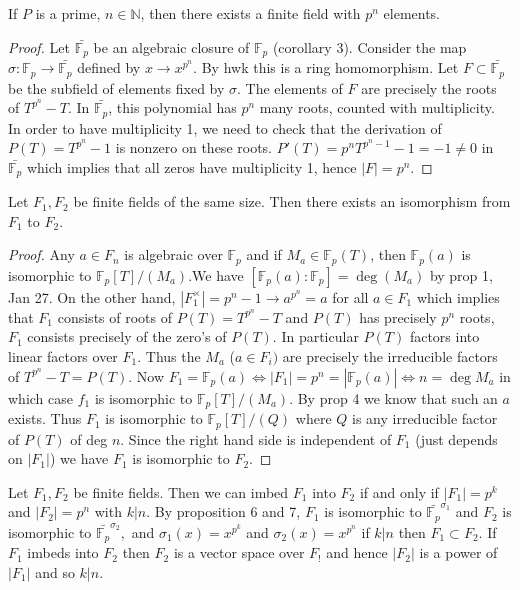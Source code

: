 \begin{prop}
If $P$ is a prime, $n\in\mathbb{N}$, then there exists a finite field with $p^n$ elements.
\end{prop}
\begin{proof} Let $\bar{\mathbb{F}_p}$ be an algebraic closure of $\mathbb{F}_p$ (corollary 3). Consider the map $\sigma:\mathbb{F}_p\longrightarrow\bar{\mathbb{F}_p}$ defined by $x\longrightarrow x^{p^n}$. By hwk this is a ring homomorphism. Let $F\subset\bar{\mathbb{F}_p}$ be the subfield of elements fixed by $\sigma$. The elements of $F$ are precisely the roots of $T^{p^n}-T$. In $\bar{\mathbb{F}_p}$, this polynomial has $p^n$ many roots, counted with multiplicity. In order to have multiplicity 1, we need to check that the derivation of $P(T)=T^{p^n}-1$ is nonzero on these roots. $P'(T)=p^nT^{p^n-1}-1=-1\ne 0$ in $\bar{\mathbb{F}_p}$ which implies that all zeros have multiplicity 1, hence $|F|=p^n$.
\end{proof}
\begin{prop}
Let $F_1,F_2$ be finite fields of the same size. Then there exists an isomorphism from $F_1$ to $F_2$.
\end{prop}
\begin{proof}
Any $a\in F_n$ is algebraic over $\mathbb{F}_p$ and if $M_a\in \mathbb{F}_p(T)$, then $\mathbb{F}_p(a)$ is isomorphic to $\mathbb{F}_p[T]/(M_a)$.We have $[\mathbb{F}_p(a):\mathbb{F}_p]=\deg(M_a)$ by prop 1, Jan 27. On the other hand, $|F_1^{\times}|=p^n-1\longrightarrow a^{p^n}=a$ for all $a\in F_1$ which implies that $F_1$ consists of roots of $P(T)=T^{p^n}-T$ and $P(T)$ has precisely $p^n$ roots, $F_1$ consists precisely of the zero's of $P(T)$. In particular $P(T)$ factors into linear factors over $F_1$.
Thus the $M_a$ ($a\in F_i)$ are precisely the irreducible factors of $T^{p^n}-T=P(T)$. Now $F_1=\mathbb{F}_p(a)\iff |F_1|=p^n=|\mathbb{F}_p(a)|\iff n=\deg M_a$ in which case $f_1$ is isomorphic to $\mathbb{F}_p[T]/(M_a).$ By prop 4 we know that such an $a$ exists. Thus $F_1$ is isomorphic to $\mathbb{F}_p[T]/(Q)$ where $Q$ is any irreducible factor of $P(T)$ of deg $n$. Since the right hand side is independent of $F_1$ (just depends on $|F_1|$) we have $F_1$ is isomorphic to $F_2$.
\end{proof}
\begin{cor}
Let $F_1,F_2$ be finite fields. Then we can imbed $F_1$ into $F_2$ if and only if $|F_1|=p^k$ and $|F_2|=p^n$ with $k|n$. By proposition 6 and 7, $F_1$ is isomorphic to $\bar{\mathbb{F}_p}^{\sigma_1}$ and $F_2$ is isomorphic to $\bar{\mathbb{F}_p}^{\sigma_2},$ and $\sigma_1(x)=x^{p^k}$ and $\sigma_2(x)=x^{p^n}$ if $k|n$ then $F_1\subset F_2$. If $F_1$ imbeds into $F_2$ then $F_2$ is a vector space over $F_!$ and hence $|F_2|$ is a power of $|F_1|$ and so $k|n$.
\end{cor}
